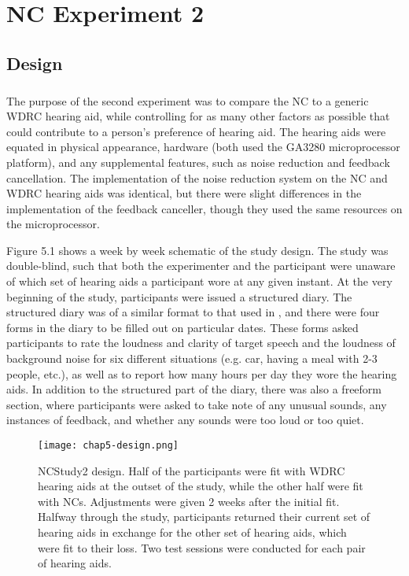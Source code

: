 \chapter{NC Experiment 2}

\section{Design}
\paragraph{}The purpose of the second experiment was to compare the NC to a generic WDRC hearing aid, while controlling for as many other factors as possible that could contribute to a person's preference of hearing aid.  The hearing aids were equated in physical appearance, hardware (both used the GA3280 microprocessor platform), and any supplemental features, such as noise reduction and feedback cancellation.  The implementation of the noise reduction system on the NC and WDRC hearing aids was identical, but there were slight differences in the implementation of the feedback canceller, though they used the same resources on the microprocessor.

Figure 5.1 shows a week by week schematic of the study design.  The study was double-blind, such that both the experimenter and the participant were unaware of which set of hearing aids a participant wore at any given instant.  At the very beginning of the study, participants were issued a structured diary.  The structured diary was of a similar format to that used in , and there were four forms in the diary to be filled out on particular dates.  These forms asked participants to rate the loudness and clarity of target speech and the loudness of background noise for six different situations (e.g. car, having a meal with 2-3 people, etc.), as well as to report how many hours per day they wore the hearing aids.  In addition to the structured part of the diary, there was also a freeform section, where participants were asked to take note of any unusual sounds, any instances of feedback, and whether any sounds were too loud or too quiet.

\begin{figure}[htp]
\begin{center}
\texttt{[image: chap5-design.png]}\\
\caption[NCStudy2 design]{NCStudy2 design.  Half of the participants were fit with WDRC hearing aids at the outset of the study, while the other half were fit with NCs.  Adjustments were given 2 weeks after the initial fit.  Halfway through the study, participants returned their current set of hearing aids in exchange for the other set of hearing aids, which were fit to their loss.  Two test sessions were conducted for each pair of hearing aids.}
\label{ch5-design}
\end{center}
\end{figure}

